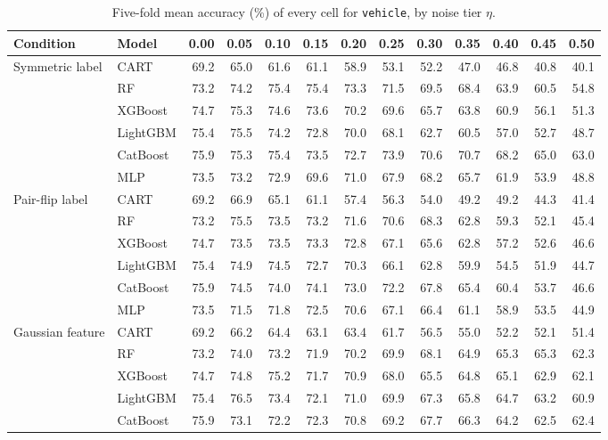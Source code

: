 \begin{table}[p]
\centering
\tiny
\setlength{\tabcolsep}{2.6pt}
\caption{Five-fold mean accuracy (\%) of every cell for \texttt{vehicle}, by noise tier $\eta$.}
\label{tab:grid_vehicle}
\begin{tabular}{@{}llrrrrrrrrrrr@{}}
\toprule
Condition & Model & 0.00 & 0.05 & 0.10 & 0.15 & 0.20 & 0.25 & 0.30 & 0.35 & 0.40 & 0.45 & 0.50 \\
\midrule
Symmetric label & CART & 69.2 & 65.0 & 61.6 & 61.1 & 58.9 & 53.1 & 52.2 & 47.0 & 46.8 & 40.8 & 40.1 \\
 & RF & 73.2 & 74.2 & 75.4 & 75.4 & 73.3 & 71.5 & 69.5 & 68.4 & 63.9 & 60.5 & 54.8 \\
 & XGBoost & 74.7 & 75.3 & 74.6 & 73.6 & 70.2 & 69.6 & 65.7 & 63.8 & 60.9 & 56.1 & 51.3 \\
 & LightGBM & 75.4 & 75.5 & 74.2 & 72.8 & 70.0 & 68.1 & 62.7 & 60.5 & 57.0 & 52.7 & 48.7 \\
 & CatBoost & 75.9 & 75.3 & 75.4 & 73.5 & 72.7 & 73.9 & 70.6 & 70.7 & 68.2 & 65.0 & 63.0 \\
 & MLP & 73.5 & 73.2 & 72.9 & 69.6 & 71.0 & 67.9 & 68.2 & 65.7 & 61.9 & 53.9 & 48.8 \\
\midrule
Pair-flip label & CART & 69.2 & 66.9 & 65.1 & 61.1 & 57.4 & 56.3 & 54.0 & 49.2 & 49.2 & 44.3 & 41.4 \\
 & RF & 73.2 & 75.5 & 73.5 & 73.2 & 71.6 & 70.6 & 68.3 & 62.8 & 59.3 & 52.1 & 45.4 \\
 & XGBoost & 74.7 & 73.5 & 73.5 & 73.3 & 72.8 & 67.1 & 65.6 & 62.8 & 57.2 & 52.6 & 46.6 \\
 & LightGBM & 75.4 & 74.9 & 74.5 & 72.7 & 70.3 & 66.1 & 62.8 & 59.9 & 54.5 & 51.9 & 44.7 \\
 & CatBoost & 75.9 & 74.5 & 74.0 & 74.1 & 73.0 & 72.2 & 67.8 & 65.4 & 60.4 & 53.7 & 46.6 \\
 & MLP & 73.5 & 71.5 & 71.8 & 72.5 & 70.6 & 67.1 & 66.4 & 61.1 & 58.9 & 53.5 & 44.9 \\
\midrule
Gaussian feature & CART & 69.2 & 66.2 & 64.4 & 63.1 & 63.4 & 61.7 & 56.5 & 55.0 & 52.2 & 52.1 & 51.4 \\
 & RF & 73.2 & 74.0 & 73.2 & 71.9 & 70.2 & 69.9 & 68.1 & 64.9 & 65.3 & 65.3 & 62.3 \\
 & XGBoost & 74.7 & 74.8 & 75.2 & 71.7 & 70.9 & 68.0 & 65.5 & 64.8 & 65.1 & 62.9 & 62.1 \\
 & LightGBM & 75.4 & 76.5 & 73.4 & 72.1 & 71.0 & 69.9 & 67.3 & 65.8 & 64.7 & 63.2 & 60.9 \\
 & CatBoost & 75.9 & 73.1 & 72.2 & 72.3 & 70.8 & 69.2 & 67.7 & 66.3 & 64.2 & 62.5 & 62.4 \\

\end{tabular}
\end{table}
